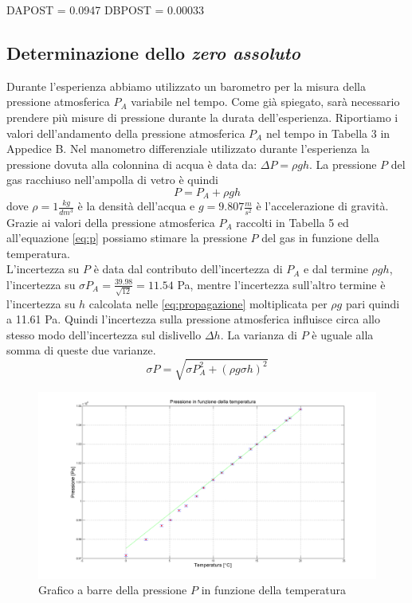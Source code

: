 DAPOST = 0.0947
DBPOST = 0.00033


\subsection{Determinazione dello \emph{zero assoluto}}
Durante l'esperienza abbiamo utilizzato un barometro per la misura della pressione atmosferica $P_A$ variabile nel tempo. 
Come già spiegato, sarà necessario prendere più misure di pressione durante la durata dell'esperienza.
Riportiamo i valori dell'andamento della pressione atmosferica $P_A$ nel tempo in Tabella 3 in Appedice B.
Nel manometro differenziale utilizzato durante l'esperienza la pressione dovuta alla colonnina di acqua è data da: $\Delta P = \rho gh$. 
La pressione $P$ del gas racchiuso nell'ampolla di vetro è quindi 
\begin{equation}
\label{eq:p}
P = P_A + \rho gh
\end{equation}
dove $\rho = 1 \frac{kg}{dm^3}$ è la densità dell'acqua e $g = 9.807 \frac{m}{s^2}$ è l'accelerazione di gravità.
Grazie ai valori della pressione atmosferica $P_A$ raccolti in Tabella 5 ed all'equazione \eqref{eq:p} possiamo stimare la pressione $P$ del gas in funzione della temperatura.\\
L'incertezza su $P$ è data dal contributo dell'incertezza di $P_A$ e dal termine $\rho gh$, l'incertezza su $\sigma P_A = \frac{39.98}{\sqrt{12}} = 11.54$ Pa, mentre l'incertezza sull'altro termine è l'incertezza su $h$ calcolata nelle \eqref{eq:propagazione} moltiplicata per $\rho g$ pari quindi a 11.61 Pa. 
Quindi l'incertezza sulla pressione atmosferica influisce circa allo stesso modo dell'incertezza sul dislivello $\Delta h$.
La varianza di $P$ è uguale alla somma di queste due varianze.
\begin{equation}
\label{eq:sigma P}
\sigma P = \sqrt{\sigma P_A^2 + (\rho g \sigma h)^2}
\end{equation}

\begin{figure}[H]
\centering
\includegraphics[width=\textwidth]{img/3}
\caption{Grafico a barre della pressione $P$ in funzione della temperatura}
\end{figure}

